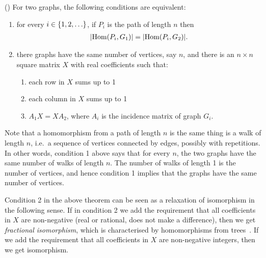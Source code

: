 \begin{theorem}\label{thm:grohe}(\cite[Theorem 2]{groheDellRattan2018})
    For two graphs, the following conditions are equivalent:
    \begin{enumerate}
        \item for every $i \in \{1,2,\ldots\}$, if $P_i$ is the path of length $n$ then
        \begin{align*}
        |\mathrm {Hom}(P_i,G_1) | = |\mathrm {Hom}(P_i,G_2)|.
        \end{align*}
        \item there graphs have the same number of vertices, say $n$, and there is an $n \times n$ square matrix $X$ with real coefficients such that:
        \begin{enumerate}
            \item each row in $X$ sums up to 1
            \item each column in $X$ sums up to 1
            \item $A_1 X = X A_2$, where $A_i$ is the incidence matrix of graph $G_i$.
        \end{enumerate}
    \end{enumerate}
\end{theorem}
Note that a homomorphism from a path of length $n$ is the same thing is a walk of length $n$, i.e.~a sequence of vertices connected by edges, possibly with repetitions.  In other words, condition 1 above says that for every $n$, the two graphs have the same number of walks of length $n$. The number of walks of length 1 is the number of vertices, and hence condition 1 implies that the graphs have the same number of vertices.     

Condition 2 in the above theorem can be seen as a relaxation of isomorphism in the following sense. 
If in condition 2 we add the requirement that all coefficients in $X$ are non-negative (real or rational, does not make a difference), then we get  \emph{fractional isomorphism}, which is characterised by homomorphisms from trees~\cite[Theorem 1]{groheDellRattan2018}. If we add the requirement that all coefficients in $X$ are non-negative integers, then we get isomorphism.  

